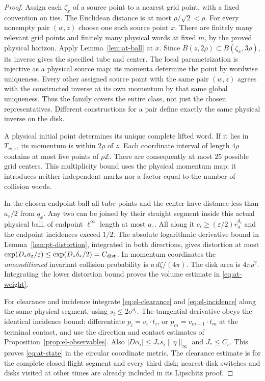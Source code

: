 \begin{proof}
Assign each $\zeta_x$ of a source point to a nearest grid point,
with a fixed convention on ties.  The Euclidean distance is at
most $\rho/\sqrt2<\rho$.  For every nonempty pair $(w,z)$ choose
one such source point $x$.  There are finitely many relevant grid
points and finitely many physical words at fixed $m$, by the
proved physical horizon.  Apply Lemma~\ref{lem:at-ball} at $x$.
Since $B(z,2\rho)\subset B(\zeta_x,3\rho)$, its inverse gives
the specified tube and center.  The local parametrization is
injective as a physical source map: its momenta determine the
point by wordwise uniqueness.  Every other assigned source point
with the same pair $(w,z)$ agrees with the constructed inverse at
its own momentum by that same global uniqueness.  Thus the family
covers the entire class, not just the chosen representatives.
Different constructions for a pair define exactly the same
physical inverse on the disk.

A physical initial point determines its unique complete lifted
word.  If it lies in $T_{w,z}$, its momentum is within $2\rho$ of
$z$.  Each coordinate interval of length $4\rho$ contains at
most five points of $\rho\mathbb Z$.  There are consequently at
most $25$ possible grid centers.  This multiplicity bound uses the
physical momentum map; it introduces neither independent marks
nor a factor equal to the number of collision words.

In the chosen endpoint ball all tube points and the center have
distance less than $a_\varepsilon/2$ from $q_x$.  Any two can be
joined by their straight segment inside this actual physical ball,
of endpoint $\ell^\infty$ length at most $a_\varepsilon$.
All along it $c_i\ge(\varepsilon/2)r_g^{d_i}$ and the endpoint
incidences exceed $1/2$.  The absolute logarithmic derivative
bound in Lemma~\ref{lem:pt-distortion}, integrated in both
directions, gives distortion at most
$\exp(D_*a_\varepsilon/\varepsilon)
\le\exp(D_*\delta_*/2)=C_{\rm dist}$.
In momentum coordinates the \emph{unconditioned} invariant
collision probability is $u\,d\zeta/(4\pi)$.  The disk area is
$4\pi\rho^2$.  Integrating the lower distortion bound proves
the volume estimate in \eqref{eq:at-weight}.

For clearance and incidence integrate
\eqref{eq:el-clearance} and \eqref{eq:el-incidence} along the
same physical segment, using $s_i\le2\sigma^{d_i}$.
The tangential derivative obeys the identical incidence bound:
differentiate $p_i=v_i\cdot t_i$, or
$p_m=v_{m-1}\cdot t_m$ at the terminal contact, and use the
direction and contact estimates of
Proposition~\ref{prop:el-observables}.  Also
$|D\alpha_i|\le J_*s_i\|\eta\|_\infty$ and $J_*\le C_c$.
This proves \eqref{eq:at-state} in the circular coordinate metric.
The clearance estimate is for the complete closed flight segment
and every third disk; nearest-disk switches and disks visited at
other times are already included in its Lipschitz proof.
\end{proof}


